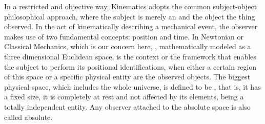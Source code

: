 In a restricted and objective way, Kinematics adopts the common subject-object philosophical approach, where the subject is merely an  and the object the thing observed. In the act of kinematically describing a mechanical event, the observer makes use of two fundamental concepts: position and time. In Newtonian or Classical Mechanics, which is our concern here, , mathematically modeled as a three dimensional Euclidean space, is the context or the framework that enables the subject to perform its positional identifications, when either a certain region of this space or a specific physical entity are the observed objects. The biggest physical space, which includes the whole universe, is defined to be , that is, it has a fixed size, it is completely at rest and not affected by its elements, being a totally independent entity. Any observer attached to the absolute space is also called absolute. 

